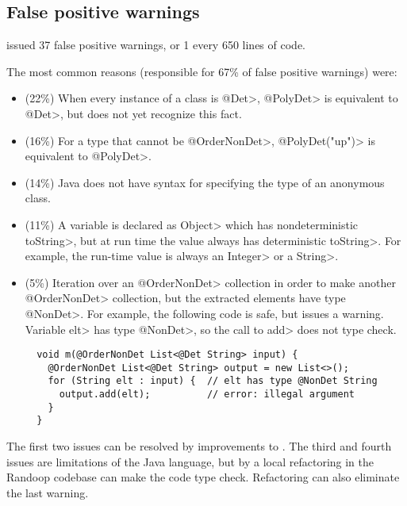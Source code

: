 \subsection{False positive warnings}

\TheDeterminismChecker issued 37 false positive warnings, or 1 every 650
lines of code.

The most common reasons (responsible for 67\% of false positive warnings)
were:

\begin{itemize}
\item   (22\%)
  When every instance of a class is \<@Det>, \<@PolyDet> is equivalent to
  \<@Det>, but \theDeterminismChecker does not yet recognize this fact.
\item  (16\%)
  For a type that cannot be \<@OrderNonDet>, \<@PolyDet("up")> is
  equivalent to \<@PolyDet>.
\item (14\%)
  Java does not have syntax for specifying the type of an anonymous class.
\item (11\%)
  A variable is declared as \<Object> which has nondeterministic \<toString>,
  but at run time the value always has deterministic \<toString>.  For
  example, the run-time value is always an \<Integer> or a \<String>.
\item (5\%)
  Iteration over an \<@OrderNonDet> collection in order to make another
  \<@OrderNonDet> collection, but the extracted elements have type
  \<@NonDet>.  For example, the following code is safe, but
  \theDeterminismChecker issues a warning.  Variable \<elt> has type
  \<@NonDet>, so the call to \<add> does not type check.
\begin{Verbatim}
  void m(@OrderNonDet List<@Det String> input) {
    @OrderNonDet List<@Det String> output = new List<>();
    for (String elt : input) {  // elt has type @NonDet String
      output.add(elt);          // error: illegal argument
    }
  }
\end{Verbatim}
  
\end{itemize}

The first two issues can be resolved by improvements to
\theDeterminismCheckerImplementation.
The third and fourth issues are limitations of the Java language, but by a
local refactoring in the Randoop codebase can make the code type check.
Refactoring can also eliminate the last warning.



